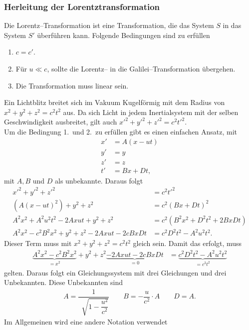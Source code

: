\documentclass[a4paper,12pt]{article}
\begin{document}
\subsubsection{Herleitung der Lorentztransformation}
Die Lorentz--Transformation ist eine Transformation, die das System $S$ in das System $S'$ überführen kann. Folgende Bedingungen sind zu erfüllen
\begin{enumerate}[label=\arabic*.]
        \item $c=c'$.
        \item Für $u\ll c$, sollte die Lorentz-- in die Galilei--Transformation übergehen.
        \item Die Transformation muss linear sein.
\end{enumerate}
Ein Lichtblitz breitet sich im Vakuum Kugelförmig mit dem Radius von $x^2+y^2+z^2=c^2t^2$ aus. Da sich Licht in jedem Inertialsystem mit der selben Geschwindigkeit ausbreitet, gilt auch $x'^2+y'^2+z'^2=c^2t'^2$.\\\indent
Um die Bedingung 1.\ und 2.\ zu erfüllen gibt es einen einfachen Ansatz, mit
\begin{align*}
        x'&=A\left(x-ut\right)\\
        y'&=y\\
        z'&=z\\
        t'&=Bx+Dt
,\end{align*}
mit $A,B$ und $D$ als unbekannte. Daraus folgt
\begin{align*} 
        x'^2+y'^2+z'^2&=c^2t'^2\\
        \left(A\left(x-ut\right)^2\right)+y^2+z^2&=c^2\left(Bx+Dt\right)^2\\
        A^2x^2+A^2u^2t^2-2Axut+y^2+z^2&=c^2\left(B^2x^2+D^2t^2+2BxDt\right)\\
        A^2x^2-c^2B^2x^2+y^2+z^2-2Axut-2cBxDt&=c^2D^2t^2-A^2u^2t^2
.\end{align*} 
Dieser Term muss mit $x^2+y^2+z^2=c^2t^2$ gleich sein. Damit das erfolgt, muss
\begin{align*} 
        \underbrace{A^2x^2-c^2B^2x^2}_{=x^2}+y^2+z^2\underbrace{-2Axut-2cBxDt}_{=0}&=\underbrace{c^2D^2t^2-A^2u^2t^2}_{=c^2t^2}
\end{align*} 
gelten. Daraus folgt ein Gleichungssystem mit drei Gleichungen und drei Unbekannten. Diese Unbekannten sind
\begin{align*} 
        A=\dfrac{1}{\,\sqrt[]{1-\dfrac{u^2}{c^2} }}\qquad B=-\dfrac{u}{c^2}\cdot A\qquad D=A
.\end{align*} 
Im Allgemeinen wird eine andere Notation verwendet
\end{document}
